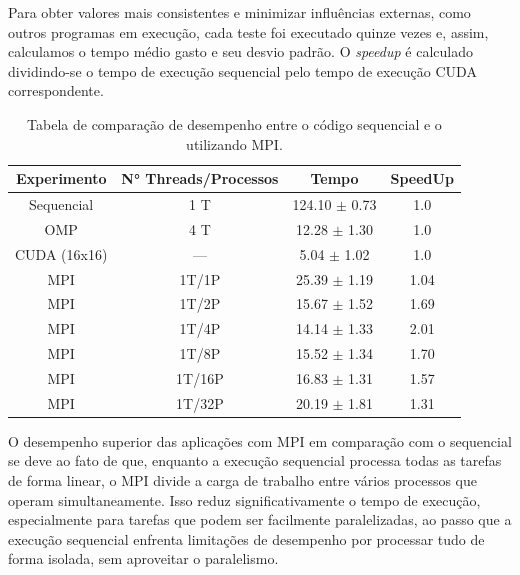 \documentclass[12pt]{article}
\begin{document}
Para obter valores mais consistentes e minimizar influências externas, como
outros programas em execução, cada teste foi executado quinze vezes e, assim,
calculamos o tempo médio gasto e seu desvio padrão. O \textit{speedup} é
calculado dividindo-se o tempo de execução sequencial pelo tempo de execução
CUDA correspondente.

\begin{table}[ht]
  \centering
  \caption{Tabela de comparação de desempenho entre o código sequencial e o
    utilizando MPI.}\label{tab:results}
  \vspace{0.3cm}
  \begin{tabular}{||c c c c||}
    \hline
    Experimento  & N° Threads/Processos & Tempo             & SpeedUp \\ [0.5ex]
    \hline\hline
    Sequencial   & 1 T                  & 124.10 $\pm$ 0.73 & 1.0     \\
    \hline
    OMP          & 4 T                  & 12.28 $\pm$ 1.30  & 1.0     \\
    \hline
    CUDA (16x16) & ---                  & 5.04 $\pm$ 1.02   & 1.0     \\
    \hline
    MPI          & 1T/1P                & 25.39 $\pm$ 1.19  & 1.04    \\
    \hline
    MPI          & 1T/2P                & 15.67 $\pm$ 1.52  & 1.69    \\
    \hline
    MPI          & 1T/4P                & 14.14 $\pm$ 1.33  & 2.01    \\
    \hline
    MPI          & 1T/8P                & 15.52 $\pm$ 1.34  & 1.70    \\
    \hline
    MPI          & 1T/16P               & 16.83 $\pm$ 1.31  & 1.57    \\
    \hline
    MPI          & 1T/32P               & 20.19 $\pm$ 1.81  & 1.31    \\
    \hline
  \end{tabular}
\end{table}

O desempenho superior das aplicações com MPI em comparação com o sequencial se
deve ao fato de que, enquanto a execução sequencial processa todas as tarefas
de forma linear, o MPI divide a carga de trabalho entre vários processos que
operam simultaneamente. Isso reduz significativamente o tempo de execução,
especialmente para tarefas que podem ser facilmente paralelizadas, ao passo que
a execução sequencial enfrenta limitações de desempenho por processar tudo de
forma isolada, sem aproveitar o paralelismo.
\end{document}
